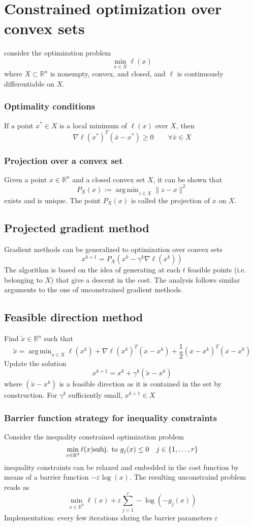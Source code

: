 \documentclass{book}
\DeclareMathOperator*{\argmin}{arg\,min}
\newcommand{\R}{\mathbb{R}}
\theoremstyle{definition}
\theoremstyle{remark}
\theoremstyle{remark}
\begin{document}
\section{Constrained optimization over convex sets}
consider the optimization problem 
\[
    \min_{x\in X}\ell(x)
\]
where $X \subset \R^n$ is nonempty, convex, and closed, and $\ell$ is continuously differentiable on $X$. 
\subsubsection{Optimality conditions}
If a point $x^* \in X$ is a local minimum of $\ell(x)$ over $X$, then 
\[
    \nabla\ell(x^*)^T(\bar{x}-x^*)\geq 0 \qquad \forall\bar{x}\in X
\]
\subsubsection{Projection over a convex set}
Given a point $x\in\R^n$ and a closed convex set $X$, it can be shown that 
\[
    P_X(x) := \argmin_{z\in X}\|z-x\|^2
\]
exists and is unique. The point $P_X(x)$ is called the projection of $x$ on $X$.
\subsection{Projected gradient method}
Gradient methods can be generalized to optimization over convex sets 
\[
    x^{k+1}=P_X(x^k-\gamma^k\nabla\ell(x^k))
\]
The algorithm is based on the idea of generating at each $t$ feasible points (i.e. belonging to $X$) that give a descent in the cost. The analysis follows similar arguments to the one of unconstrained gradient methods.

\subsection{Feasible direction method}
Find $\tilde{x}\in\R^n$ such that 
\[
    \tilde{x} = \argmin_{x\in X} \ell(x^k)+\nabla\ell(x^k)^T(x-x^k)+\displaystyle\frac{1}{2}(x-x^k)^T(x-x^k)
\]
Update the solution 
\[
    x^{k+1}=x^k+\gamma^k(\tilde{x}-x^k)
\]
where $(\tilde{x}-x^k)$ is a feasible direction as it is contained in the set by construction. For $\gamma^k$ sufficiently small, $x^{k+1}\in X$

\subsubsection{Barrier function strategy for inequality constraints}
Consider the inequality constrained optimization problem 
\[
    \min_{x\in\R^d}\ell(x)\\
    \text{subj. to } g_j(x)\leq 0 \quad j\in \{1,\dots,r\}
\]  
inequality constraints can be relaxed and embedded in the cost function by means of a barrier function $-\varepsilon \log(x)$. The resulting unconstraind problem reads as 
\[
    \min_{x\in\R^d} \ell(x) + \varepsilon \displaystyle\sum_{j=1}^{r}-\log(-g_j(x))
\]
Implementation: every few iterations shring the barrier parameters $\varepsilon$
\end{document}
